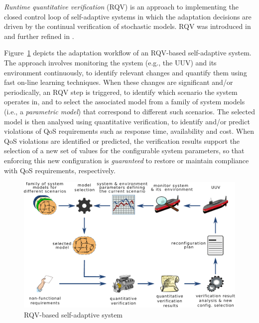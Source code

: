 
\textit{Runtime quantitative verification} (RQV) \cite{Calinescu2012:CACM} is an approach to implementing the closed control loop of self-adaptive systems in which the adaptation decisions are driven by the continual verification of stochastic models. RQV was introduced in \cite{Calinescu2009:ICSE,Epifani2009:ICSE} and further refined in \cite{Calinescu2011:TSE,Filieri2011:ICSE,Johnson2013:CBSE}. 


Figure~\ref{fig:RQV} depicts the adaptation workflow of an RQV-based self-adaptive system. The approach involves monitoring the system (e.g., the UUV) and its environment continuously, to identify relevant changes and quantify them using fast on-line learning techniques. When these changes are significant and/or periodically, an RQV step is triggered, to identify which scenario the system operates in, and to select the associated model from a family of system models (i.e., a \emph{parametric model}) that correspond to different such scenarios. The selected model is then analysed using quantitative verification, to identify and/or predict violations of QoS requirements such as response time, availability and cost. When QoS violations are identified or predicted, the verification results support the selection of a new set of values for the configurable system parameters, so that enforcing this new configuration is \emph{guaranteed} to restore or maintain compliance with QoS requirements, respectively.

\begin{figure}[t]
\centering
\includegraphics[width=0.75\hsize]{figures/rqv.pdf}
\caption{RQV-based self-adaptive system}
\label{fig:RQV}

\vspace*{-2mm}
\end{figure}